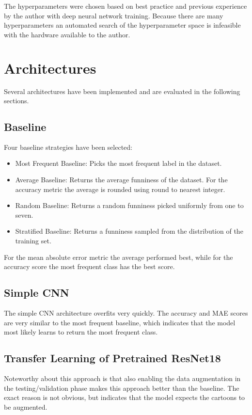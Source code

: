 \documentclass[draft,final,oneside]{vutinfth} %
\begin{document}
The hyperparameters were chosen based on best practice and previous
experience by the author with deep neural network training. Because there are many hyperparameters an automated search of the hyperparameter space is infeasible with the hardware available to the author.

\section{Architectures}
Several architectures have been implemented and are evaluated in the following sections.


\subsection{Baseline}

Four baseline strategies have been selected: 

\begin{itemize}

\item Most Frequent Baseline: Picks the most frequent label in the dataset.
\item Average Baseline: Returns the average funniness of the dataset. For the accuracy metric the average is rounded using round to nearest integer.
\item Random Baseline: Returns a random funniness picked uniformly from one to seven.
\item Stratified Baseline: Returns a funniness sampled from the distribution of the
training set.

\end{itemize}

For the mean absolute error metric the average performed best, while for the accuracy score the most frequent class has the best score.

\subsection{Simple CNN}
The simple CNN architecture overfits very quickly. The accuracy and MAE scores are very similar to the most frequent baseline, which indicates that the model most likely learns to return the most frequent class.

\subsection{Transfer Learning of Pretrained ResNet18}
Noteworthy about this approach is that also enabling the data augmentation in the testing/validation phase makes this approach better than the baseline. The exact reason is not obvious, but indicates that the model expects the cartoons to be augmented.
\end{document}
